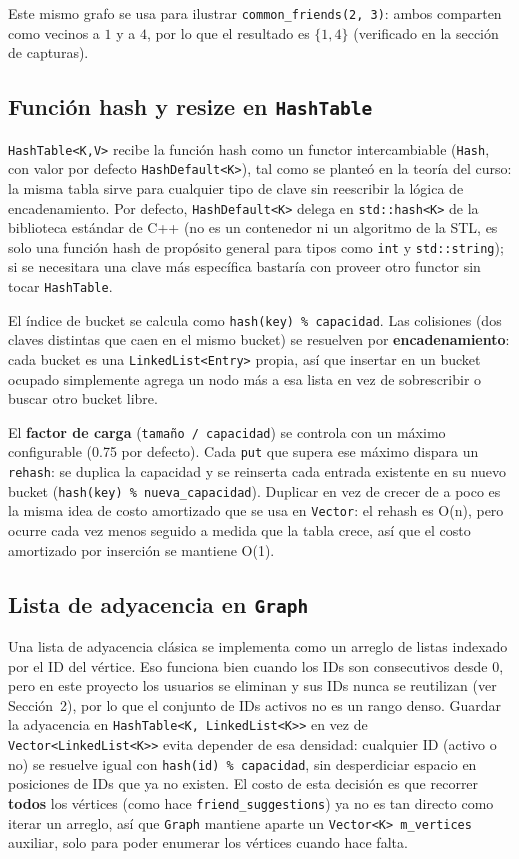 \documentclass[11pt,a4paper]{article}
\begin{document}
Este mismo grafo se usa para ilustrar \texttt{common\_friends(2, 3)}:
ambos comparten como vecinos a $1$ y a $4$, por lo que el resultado es
$\{1, 4\}$ (verificado en la sección de capturas).

\subsection{Función hash y resize en \texttt{HashTable}}
\label{sec:hashtable-detalle}

\texttt{HashTable<K,V>} recibe la función hash como un functor
intercambiable (\texttt{Hash}, con valor por defecto \texttt{HashDefault<K>}),
tal como se planteó en la teoría del curso: la misma tabla sirve para
cualquier tipo de clave sin reescribir la lógica de encadenamiento. Por
defecto, \texttt{HashDefault<K>} delega en \texttt{std::hash<K>} de la
biblioteca estándar de C++ (no es un contenedor ni un algoritmo de la
STL, es solo una función hash de propósito general para tipos como
\texttt{int} y \texttt{std::string}); si se necesitara una clave más
específica bastaría con proveer otro functor sin tocar \texttt{HashTable}.

El índice de bucket se calcula como \texttt{hash(key) \% capacidad}. Las
colisiones (dos claves distintas que caen en el mismo bucket) se resuelven
por \textbf{encadenamiento}: cada bucket es una \texttt{LinkedList<Entry>}
propia, así que insertar en un bucket ocupado simplemente agrega un nodo
más a esa lista en vez de sobrescribir o buscar otro bucket libre.

El \textbf{factor de carga} (\texttt{tamaño / capacidad}) se controla con
un máximo configurable (0.75 por defecto). Cada \texttt{put} que supera
ese máximo dispara un \texttt{rehash}: se duplica la capacidad y se
reinserta cada entrada existente en su nuevo bucket (\texttt{hash(key) \%
nueva\_capacidad}). Duplicar en vez de crecer de a poco es la misma idea
de costo amortizado que se usa en \texttt{Vector}: el rehash es O(n), pero
ocurre cada vez menos seguido a medida que la tabla crece, así que el
costo amortizado por inserción se mantiene O(1).

\subsection{Lista de adyacencia en \texttt{Graph}}

Una lista de adyacencia clásica se implementa como un arreglo de listas
indexado por el ID del vértice. Eso funciona bien cuando los IDs son
consecutivos desde 0, pero en este proyecto los usuarios se eliminan y
sus IDs nunca se reutilizan (ver Sección~2), por lo que el conjunto de
IDs activos no es un rango denso. Guardar la adyacencia en
\texttt{HashTable<K, LinkedList<K>>} en vez de \texttt{Vector<LinkedList<K>>}
evita depender de esa densidad: cualquier ID (activo o no) se resuelve
igual con \texttt{hash(id) \% capacidad}, sin desperdiciar espacio en
posiciones de IDs que ya no existen. El costo de esta decisión es que
recorrer \textbf{todos} los vértices (como hace
\texttt{friend\_suggestions}) ya no es tan directo como iterar un arreglo, así que \texttt{Graph}
mantiene aparte un \texttt{Vector<K> m\_vertices} auxiliar, solo para
poder enumerar los vértices cuando hace falta.
\end{document}
